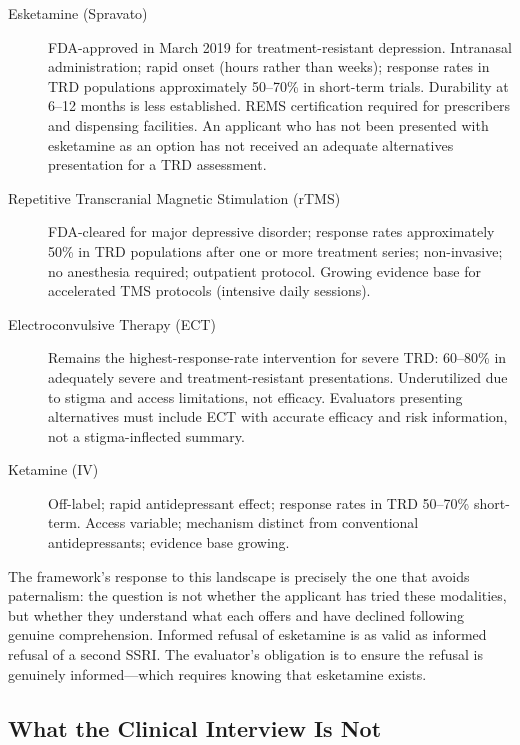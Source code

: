 \documentclass[11pt, letterpaper]{article}
\begin{document}
\begin{description}
  \item[Esketamine (Spravato)] FDA-approved in March 2019 for treatment-resistant
    depression. Intranasal administration; rapid onset (hours rather than weeks); response
    rates in TRD populations approximately 50--70\% in short-term trials. Durability at
    6--12 months is less established. REMS certification required for prescribers and
    dispensing facilities. An applicant who has not been presented with esketamine as an
    option has not received an adequate alternatives presentation for a TRD assessment.

  \item[Repetitive Transcranial Magnetic Stimulation (rTMS)] FDA-cleared for major
    depressive disorder; response rates approximately 50\% in TRD populations after
    one or more treatment series; non-invasive; no anesthesia required; outpatient
    protocol. Growing evidence base for accelerated TMS protocols (intensive daily
    sessions).

  \item[Electroconvulsive Therapy (ECT)] Remains the highest-response-rate intervention
    for severe TRD: 60--80\% in adequately severe and treatment-resistant presentations.
    Underutilized due to stigma and access limitations, not efficacy. Evaluators
    presenting alternatives must include ECT with accurate efficacy and risk information,
    not a stigma-inflected summary.

  \item[Ketamine (IV)] Off-label; rapid antidepressant effect; response rates in TRD
    50--70\% short-term. Access variable; mechanism distinct from conventional
    antidepressants; evidence base growing.
\end{description}

The framework's response to this landscape is precisely the one that avoids paternalism:
the question is not whether the applicant has tried these modalities, but whether they
understand what each offers and have declined following genuine comprehension. Informed
refusal of esketamine is as valid as informed refusal of a second SSRI. The evaluator's
obligation is to ensure the refusal is genuinely informed---which requires knowing that
esketamine exists.

\subsection{What the Clinical Interview Is Not}
\end{document}
